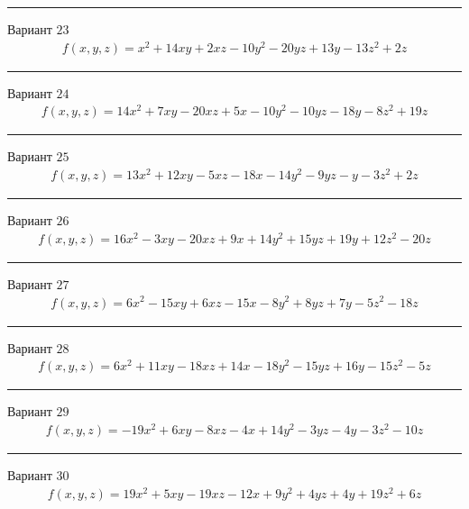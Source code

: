\documentclass[11pt]{report}
\begin{document}
\begin{center}
\noindent\rule{8cm}{0.4pt}
\end{center}
Вариант $23$
\begin{align*}
    f(x, y, z) = x^{2} + 14 x y + 2 x z - 10 y^{2} - 20 y z + 13 y - 13 z^{2} + 2 z
\end{align*}
\begin{center}
\noindent\rule{8cm}{0.4pt}
\end{center}
Вариант $24$
\begin{align*}
    f(x, y, z) = 14 x^{2} + 7 x y - 20 x z + 5 x - 10 y^{2} - 10 y z - 18 y - 8 z^{2} + 19 z
\end{align*}
\begin{center}
\noindent\rule{8cm}{0.4pt}
\end{center}
Вариант $25$
\begin{align*}
    f(x, y, z) = 13 x^{2} + 12 x y - 5 x z - 18 x - 14 y^{2} - 9 y z - y - 3 z^{2} + 2 z
\end{align*}
\begin{center}
\noindent\rule{8cm}{0.4pt}
\end{center}
Вариант $26$
\begin{align*}
    f(x, y, z) = 16 x^{2} - 3 x y - 20 x z + 9 x + 14 y^{2} + 15 y z + 19 y + 12 z^{2} - 20 z
\end{align*}
\begin{center}
\noindent\rule{8cm}{0.4pt}
\end{center}
Вариант $27$
\begin{align*}
    f(x, y, z) = 6 x^{2} - 15 x y + 6 x z - 15 x - 8 y^{2} + 8 y z + 7 y - 5 z^{2} - 18 z
\end{align*}
\begin{center}
\noindent\rule{8cm}{0.4pt}
\end{center}
Вариант $28$
\begin{align*}
    f(x, y, z) = 6 x^{2} + 11 x y - 18 x z + 14 x - 18 y^{2} - 15 y z + 16 y - 15 z^{2} - 5 z
\end{align*}
\begin{center}
\noindent\rule{8cm}{0.4pt}
\end{center}
Вариант $29$
\begin{align*}
    f(x, y, z) = - 19 x^{2} + 6 x y - 8 x z - 4 x + 14 y^{2} - 3 y z - 4 y - 3 z^{2} - 10 z
\end{align*}
\begin{center}
\noindent\rule{8cm}{0.4pt}
\end{center}
Вариант $30$
\begin{align*}
    f(x, y, z) = 19 x^{2} + 5 x y - 19 x z - 12 x + 9 y^{2} + 4 y z + 4 y + 19 z^{2} + 6 z
\end{align*}
\end{document}
